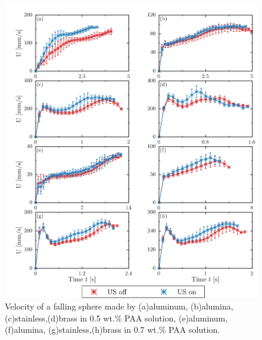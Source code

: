 \begin{figure}[h]
    \centering
    \includegraphics[width=15.0cm,clip]{5-Results/result_data/0.5-0.7.png}
    \caption{Velocity of a falling sphere made by (a)aluminum, (b)alumina, (c)stainless,(d)brass in 0.5 wt.\% PAA solution, (e)aluminum, (f)alumina, (g)stainless,(h)brass in 0.7 wt.\% PAA solution.}
    \label{fig:0.5-0.7}
\end{figure}

